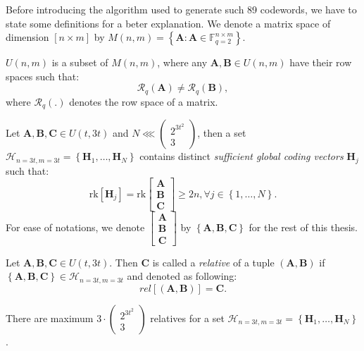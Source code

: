 Before introducing the algorithm used to generate such 89 codewords,
we have to state some definitions for a beter explanation. We denote
a matrix space of dimension $\left[n\times m\right]$ by $M(n,m)=\left\{ \boldsymbol{A}:\boldsymbol{A}\in\ensuremath{\mathbb{F}}_{q=2}^{n\times m}\right\} $.
\begin{defn}
 $U(n,m)$ is a subset of $M(n,m)$, where any $\boldsymbol{A},\boldsymbol{B}\in U(n,m)$
have their row spaces such that:
\[
\mathcal{R}_{q}\left(\boldsymbol{A}\right)\neq\mathcal{R}_{q}\left(\boldsymbol{B}\right),
\]
where $\mathcal{R}_{q}\left(.\right)$ denotes the row space of a
matrix.
\end{defn}
%
\begin{defn}
 Let $\boldsymbol{A},\boldsymbol{B},\boldsymbol{C}\in U(t,3t)$ and
$N\lll\left(\begin{array}{c}
2^{3t^{2}}\\
3
\end{array}\right)$, then a set $\mathcal{H}_{n=3t,m=3t}=\left\{ \boldsymbol{H}_{1},\ldots,\boldsymbol{H}_{N}\right\} $
contains distinct \textit{sufficient global coding vectors} $\boldsymbol{H}_{j}$
such that:
\[
\mathrm{rk}\left[\boldsymbol{H}_{j}\right]=\mathrm{rk}\left[\begin{array}{c}
\boldsymbol{A}\\
\boldsymbol{B}\\
\boldsymbol{C}
\end{array}\right]\geq2n,\forall j\in\left\{ 1,\ldots,N\right\} .
\]
For ease of notations, we denote $\left[\begin{array}{c}
\boldsymbol{A}\\
\boldsymbol{B}\\
\boldsymbol{C}
\end{array}\right]$ by $\left\{ \boldsymbol{A},\boldsymbol{B},\boldsymbol{C}\right\} $
for the rest of this thesis.
\end{defn}
%
\begin{defn}[Relative]
 Let $\boldsymbol{A},\boldsymbol{B},\boldsymbol{C}\in U(t,3t)$.
Then $\boldsymbol{C}$ is called a \textit{relative} of a tuple $\left(\boldsymbol{A},\boldsymbol{B}\right)$
if $\left\{ \boldsymbol{A},\boldsymbol{B},\boldsymbol{C}\right\} \in\mathcal{H}_{n=3t,m=3t}$
and denoted as following:
\[
rel\left[\left(\boldsymbol{A},\boldsymbol{B}\right)\right]=\boldsymbol{C}.
\]
\end{defn}
\begin{lem}
There are maximum $3\cdot\left(\begin{array}{c}
2^{3t^{2}}\\
3
\end{array}\right)$ relatives for a set $\mathcal{H}_{n=3t,m=3t}=\left\{ \boldsymbol{H}_{1},\ldots,\boldsymbol{H}_{N}\right\} $.
\label{lem:num_of_relatives}
\end{lem}
